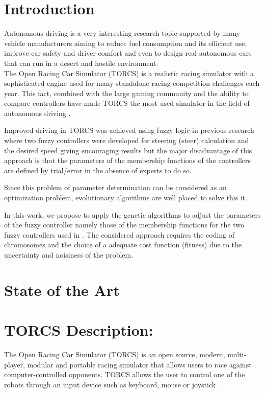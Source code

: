 \documentclass[runningheads,a4paper]{llncs}
\begin{document}
	\section{Introduction}
	\label{sec:intro}
Autonomous driving is a very interesting research topic supported by many vehicle manufacturers aiming to reduce fuel consumption and its efficient use, improve car safety and driver comfort and even to design real autonomous cars that can run in a desert and hostile environment. \\
The Open Racing Car Simulator (TORCS) is a realistic racing simulator with a sophisticated engine used for many standalone racing competition challenges each year. This fact, combined with the large gaming community and the ability to compare controllers have made TORCS the most used simulator in the field of autonomous driving \cite{17}.

Improved driving in TORCS was achieved using fuzzy logic in previous research where two fuzzy controllers were developed for steering (steer) calculation and the desired speed giving encouraging results but the major disadvantage of this approach is that the parameters of the membership functions of the controllers are defined by trial/error in the absence of experts to do so.

Since this problem of parameter determination can be considered as an optimization problem, evolutionary algorithms are well placed to solve this it.

In this work, we propose to apply the genetic algorithms to adjust the parameters of the fuzzy controller namely those of the membership functions for the two fuzzy controllers used in \cite{25}.
The considered approach  requires the coding of chromosomes and the choice of a adequate cost function (fitness) due to the uncertainty and noisiness of the problem.


	\section{State of the Art}
	\label{sec:soa}
\section{ TORCS Description: }
	\label{sec:torcs}
The Open Racing Car Simulator (TORCS) is an open source, modern, multi-player, modular and portable racing simulator that allows users to race against computer-controlled opponents. TORCS allows the user to control one of the robots through an input device such as keyboard, mouse or joystick \cite{torcs4}.
\end{document}

